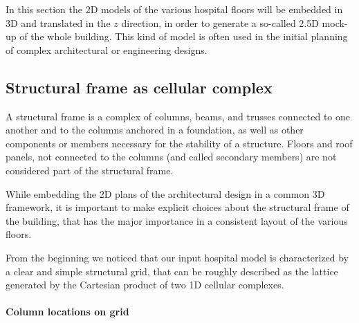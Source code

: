 \documentclass[11pt,oneside]{article}    %
\begin{document}
In this section the 2D models of the various hospital floors will be embedded in 3D and translated in the $z$ direction, in order to generate a so-called 2.5D mock-up of the whole building.
This kind of model is often used in the initial planning of complex architectural or engineering designs.

\subsection{Structural frame as cellular complex}

A structural frame is a complex of columns, beams, and trusses connected to one another and to the columns anchored in a foundation, as well as other components or members necessary for the stability of a structure. Floors and roof panels, not connected to the columns (and called secondary members) are not considered part of the structural frame.

While embedding the 2D plans of the architectural design in a common 3D framework, it is important to make explicit choices about the structural frame of the building, that has the major importance in a consistent layout of the various floors. 

From the beginning we noticed that our input hospital model is characterized by a clear and simple structural grid, that can be roughly described as the lattice generated by the Cartesian product of two 1D cellular complexes.


\paragraph{Column locations on grid}
\end{document}
